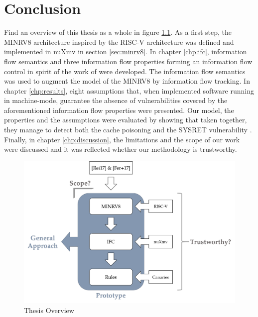 
\chapter{Conclusion}
\label{chp:conclusion}

Find an overview of this thesis as a whole in figure \ref{fig:overview}.
As a first step, the MINRV8 architecture inspired by the RISC-V architecture was defined and implemented in nuXmv in section \ref{sec:minrv8}.
In chapter \ref{chp:ifc}, information flow semantics and three information flow properties forming an information flow control in spirit of the work of \citeauthor{Ferraiuolo17} \cite{Ferraiuolo17} were developed.
The information flow semantics was used to augment the model of the MINRV8 by information flow tracking.
In chapter \ref{chp:results}, eight assumptions that, when implemented software running in machine-mode, guarantee the absence of vulnerabilities covered by the aforementioned information flow properties were presented.
Our model, the properties and the assumptions were evaluated by showing that taken together, they manage to detect both the cache poisoning \cite{Wojtczuk09} and the SYSRET vulnerability \cite{Dunlap19}.
Finally, in chapter \ref{chp:discussion}, the limitations and the scope of our work were discussed and it was reflected whether our methodology is trustworthy.

\begin{figure}
    \centering
    \includegraphics[width=\textwidth]{figures/thesis-overview.png}
    \caption{Thesis Overview}
    \label{fig:overview}
\end{figure}

